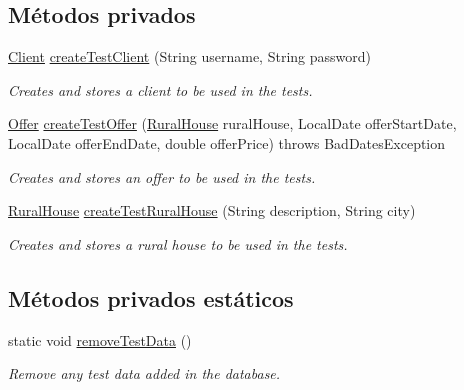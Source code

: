 \subsection*{Métodos privados}
\begin{DoxyCompactItemize}
\item 
\mbox{\hyperlink{classcom_1_1ruralhousejsf_1_1domain_1_1_client}{Client}} \mbox{\hyperlink{classcom_1_1ruralhousejsf_1_1_equals_test_a08081415d14d86f7b8a63fe7270546dc}{create\+Test\+Client}} (String username, String password)
\begin{DoxyCompactList}\small\item\em Creates and stores a client to be used in the tests. \end{DoxyCompactList}\item 
\mbox{\hyperlink{classcom_1_1ruralhousejsf_1_1domain_1_1_offer}{Offer}} \mbox{\hyperlink{classcom_1_1ruralhousejsf_1_1_equals_test_a322f0b87565b40ecb1d9d0e6246ebaa0}{create\+Test\+Offer}} (\mbox{\hyperlink{classcom_1_1ruralhousejsf_1_1domain_1_1_rural_house}{Rural\+House}} rural\+House, Local\+Date offer\+Start\+Date, Local\+Date offer\+End\+Date, double offer\+Price)  throws Bad\+Dates\+Exception 
\begin{DoxyCompactList}\small\item\em Creates and stores an offer to be used in the tests. \end{DoxyCompactList}\item 
\mbox{\hyperlink{classcom_1_1ruralhousejsf_1_1domain_1_1_rural_house}{Rural\+House}} \mbox{\hyperlink{classcom_1_1ruralhousejsf_1_1_equals_test_aaee652d5b230a23c765bd95b9691056b}{create\+Test\+Rural\+House}} (String description, String city)
\begin{DoxyCompactList}\small\item\em Creates and stores a rural house to be used in the tests. \end{DoxyCompactList}\end{DoxyCompactItemize}
\subsection*{Métodos privados estáticos}
\begin{DoxyCompactItemize}
\item 
static void \mbox{\hyperlink{classcom_1_1ruralhousejsf_1_1_equals_test_a74a69f394f6e76a2f557132edbc2ea00}{remove\+Test\+Data}} ()
\begin{DoxyCompactList}\small\item\em Remove any test data added in the database. \end{DoxyCompactList}\end{DoxyCompactItemize}


